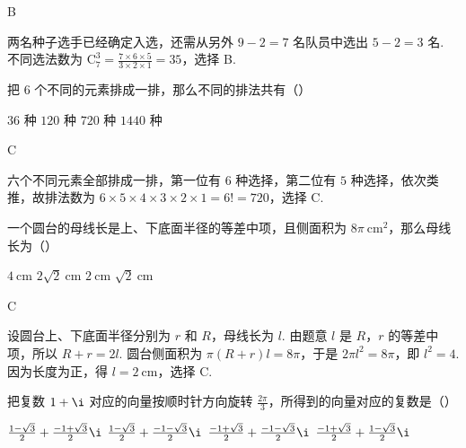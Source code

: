 \begin{answer}
B
\end{answer}

\begin{solution}
两名种子选手已经确定入选，还需从另外 \(9-2=7\) 名队员中选出 \(5-2=3\) 名. 不同选法数为 \(\mathrm C_7^3=\frac{7\times6\times5}{3\times2\times1}=35\)，选择 B.
\end{solution}

\begin{problem}
把 \(6\) 个不同的元素排成一排，那么不同的排法共有（\quad）

\choices
    {\(36\) 种}
    {\(120\) 种}
    {\(720\) 种}
    {\(1440\) 种}
\end{problem}

\begin{answer}
C
\end{answer}

\begin{solution}
六个不同元素全部排成一排，第一位有 \(6\) 种选择，第二位有 \(5\) 种选择，依次类推，故排法数为 \(6\times5\times4\times3\times2\times1=6!=720\)，选择 C.
\end{solution}

\begin{problem}
一个圆台的母线长是上、下底面半径的等差中项，且侧面积为 \(8\pi \mathrm{~cm}^2\)，那么母线长为（\quad）

\choices
    {\(4\mathrm{~cm}\)}
    {\(2\sqrt{2}\mathrm{~cm}\)}
    {\(2\mathrm{~cm}\)}
    {\(\sqrt{2}\mathrm{~cm}\)}
\end{problem}

\begin{answer}
C
\end{answer}

\begin{solution}
设圆台上、下底面半径分别为 \(r\) 和 \(R\)，母线长为 \(l\). 由题意 \(l\) 是 \(R\)，\(r\) 的等差中项，所以 \(R+r=2l\). 圆台侧面积为 \(\pi(R+r)l=8\pi\)，于是 \(2\pi l^2=8\pi\)，即 \(l^2=4\). 因为长度为正，得 \(l=2\mathrm{~cm}\)，选择 C.
\end{solution}

\begin{problem}
把复数 \(1+\i\) 对应的向量按顺时针方向旋转 \(\frac{2\pi}{3}\)，所得到的向量对应的复数是（\quad）

\choices
    {\(\frac{1-\sqrt{3}}{2}+\frac{-1+\sqrt{3}}{2}\i\)}
    {\(\frac{1-\sqrt{3}}{2}+\frac{-1-\sqrt{3}}{2}\i\)}
    {\(\frac{-1+\sqrt{3}}{2}+\frac{-1-\sqrt{3}}{2}\i\)}
    {\(\frac{-1+\sqrt{3}}{2}+\frac{1-\sqrt{3}}{2}\i\)}
\end{problem}

